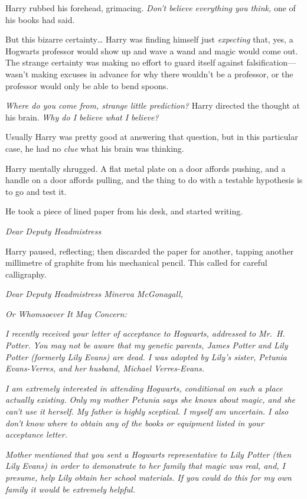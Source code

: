 Harry rubbed his forehead, grimacing. \emph{Don't believe everything you
think,} one of his books had said.

But this bizarre certainty\ldots{} Harry was finding himself just
\emph{expecting} that, yes, a Hogwarts professor would show up and wave
a wand and magic would come out. The strange certainty was making no
effort to guard itself against falsification---wasn't making excuses in
advance for why there wouldn't be a professor, or the professor would
only be able to bend spoons.

\emph{Where do you come from, strange little prediction?} Harry directed
the thought at his brain. \emph{Why do I believe what I believe?}

Usually Harry was pretty good at answering that question, but in this
particular case, he had no \emph{clue} what his brain was thinking.

Harry mentally shrugged. A flat metal plate on a door affords pushing,
and a handle on a door affords pulling, and the thing to do with a
testable hypothesis is to go and test it.

He took a piece of lined paper from his desk, and started writing.

\emph{Dear Deputy Headmistress}

Harry paused, reflecting; then discarded the paper for another, tapping
another millimetre of graphite from his mechanical pencil. This called
for careful calligraphy.

\emph{Dear Deputy Headmistress Minerva McGonagall,}

\emph{Or Whomsoever It May Concern:}

\emph{I recently received your letter of acceptance to Hogwarts,
addressed to Mr.~H. Potter. You may not be aware that my genetic
parents, James Potter and Lily Potter (formerly Lily Evans) are dead. I
was adopted by Lily's sister, Petunia Evans-Verres, and her husband,
Michael Verres-Evans.}

\emph{I am extremely interested in attending Hogwarts, conditional on
such a place actually existing. Only my mother Petunia says she knows
about magic, and she can't use it herself. My father is highly
sceptical. I myself am uncertain. I also don't know where to obtain any
of the books or equipment listed in your acceptance letter.}

\emph{Mother mentioned that you sent a Hogwarts representative to Lily
Potter (then Lily Evans) in order to demonstrate to her family that
magic was real, and, I presume, help Lily obtain her school materials.
If you could do this for my own family it would be extremely helpful.}

